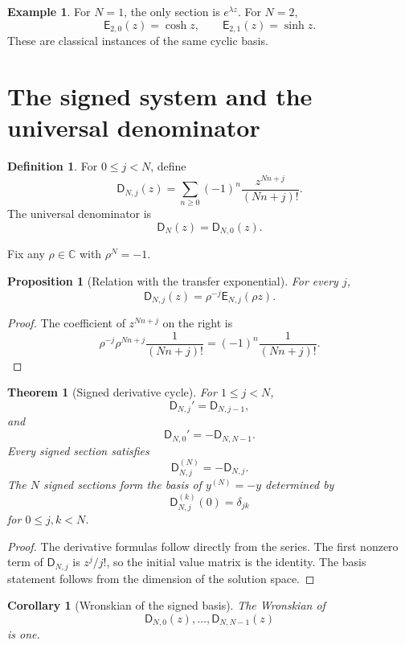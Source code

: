 \documentclass{aomart}
\newtheorem{theorem}{Theorem}[section]
\newtheorem{proposition}[proposition]{Proposition}
\newtheorem{corollary}[corollary]{Corollary}
\theoremstyle{definition}
\newtheorem{definition}[definition]{Definition}
\newtheorem{example}[example]{Example}
\theoremstyle{remark}
\newcommand{\CC}{\mathbb C}
\newcommand{\Dfun}{\mathsf D}
\newcommand{\Efun}{\mathsf E}
\begin{document}
\begin{example}\label{ex:classical_exponential}
For $N=1$, the only section is $e^{\lambda z}$.  For $N=2$,
\[
\Efun_{2,0}(z)=\cosh z,
\qquad
\Efun_{2,1}(z)=\sinh z.
\]
These are classical instances of the same cyclic basis.
\end{example}

\section{The signed system and the universal denominator}\label{sec:signed_system}

\begin{definition}\label{def:signed_sections}
For $0\leq j<N$, define
\[
\Dfun_{N,j}(z)
=
\sum_{n\geq0}(-1)^n\frac{z^{Nn+j}}{(Nn+j)!}.
\]
The universal denominator is
\[
\Dfun_N(z)=\Dfun_{N,0}(z).
\]
\end{definition}

Fix any $\rho\in\CC$ with $\rho^N=-1$.

\begin{proposition}[Relation with the transfer exponential]\label{prop:signed_exponential_relation}
For every $j$,
\[
\Dfun_{N,j}(z)
=
\rho^{-j}\Efun_{N,j}(\rho z).
\]
\end{proposition}

\begin{proof}
The coefficient of $z^{Nn+j}$ on the right is
\[
\rho^{-j}\rho^{Nn+j}\frac1{(Nn+j)!}
=
(-1)^n\frac1{(Nn+j)!}.
\]
\end{proof}

\begin{theorem}[Signed derivative cycle]\label{thm:signed_cycle}
For $1\leq j<N$,
\[
\Dfun_{N,j}'=\Dfun_{N,j-1},
\]
and
\[
\Dfun_{N,0}'=-\Dfun_{N,N-1}.
\]
Every signed section satisfies
\[
\Dfun_{N,j}^{(N)}=-\Dfun_{N,j}.
\]
The $N$ signed sections form the basis of $y^{(N)}=-y$ determined by
\[
\Dfun_{N,j}^{(k)}(0)=\delta_{jk}
\]
for $0\leq j,k<N$.
\end{theorem}

\begin{proof}
The derivative formulas follow directly from the series.  The first nonzero term of $\Dfun_{N,j}$ is $z^j/j!$, so the initial value matrix is the identity.  The basis statement follows from the dimension of the solution space.
\end{proof}

\begin{corollary}[Wronskian of the signed basis]\label{cor:signed_wronskian}
The Wronskian of
\[
\Dfun_{N,0}(z),\ldots,\Dfun_{N,N-1}(z)
\]
is one.
\end{corollary}
\end{document}
